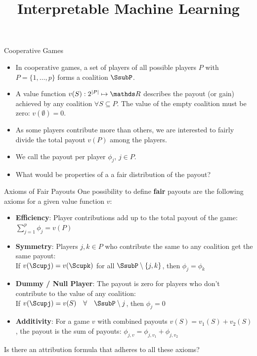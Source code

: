 \documentclass[10pt,compress,t,notes=noshow, xcolor=table]{beamer}
\title{Interpretable Machine Learning}
\date{}
\begin{document}
\newcommand{\learninggoals}{%
\item Understand fair attribution in cooperative games
\item Learn about Shapley values
}




\begin{vbframe}{Cooperative Games}
\begin{itemize}
  \item In cooperative games, a set of players of all possible players $P$ with $P = \{1, \hdots, p\}$ forms a coalition $\SsubP$.
  \item A value function $v(S): 2^{|P|}\mapsto \R$ describes the payout (or gain) achieved by any coalition $\forall S \subseteq P$. The value of the empty coalition must be zero: $v(\emptyset) = 0$.
  \item As some players contribute more than others, we are interested to fairly divide the total payout $v(P)$ among the players.
  \item We call the payout per player $\phi_j$, $j \in P$.
  \item What would be properties of a a fair distribution of the payout?
\end{itemize}
\end{vbframe}


\begin{vbframe}{Axioms of Fair Payouts}
  One possibility to define \textbf{fair} payouts are the following axioms for a given value function $v$:
  \begin{itemize}
    \item \textbf{Efficiency}: Player contributions add up to the total payout of the game:
      $\sum\nolimits_{j=1}^p\phi_j = v(P)$
    \item \textbf{Symmetry}: Players $j,k \in P$ who contribute the same to any coalition get the same payout: \\
      If $v(\Scupj) = v(\Scupk)$ for all $\SsubP \setminus\{j,k\}$, then $\phi_j=\phi_k$
    \item \textbf{Dummy / Null Player}: The payout is zero for players who don't contribute to the value of any coalition: \\
      If $v(\Scupj)=v(S)\quad  \forall \quad \SsubP \setminus j$, then $\phi_j=0$
    \item \textbf{Additivity}: For a game $v$ with combined payouts $v(S) = v_1(S) + v_2(S)$, the payout is the sum of payouts: $\phi_{j,v} = \phi_{j,v_1} + \phi_{j, v_2}$
  \end{itemize}

  Is there an attribution formula that adheres to all these axioms?

\end{vbframe}
\end{document}
